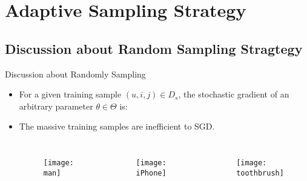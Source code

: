 \section{Adaptive Sampling Strategy}
	
\subsection*{Discussion about Random Sampling Stragtegy}
\begin{frame}{Discussion about Randomly Sampling}
	\begin{itemize}
		\setlength{\itemsep}{1.5em}
		\item For a given training sample $\left(u,i,j\right) \in D_s$, the stochastic gradient of an arbitrary parameter $\theta \in \Theta$ is:
		
		
		
		\item The massive training samples are inefficient to SGD.
		
		\begin{columns}
			\column{3cm}
			\begin{figure}
				\vspace{1em}
				\texttt{[image: man]}
			\end{figure}
			\column{4cm}
			\begin{figure}
				\vspace{1em}
				\texttt{[image: iPhone]}
			\end{figure}
			\column{4cm}
			\begin{figure}
				\vspace{1em}
				\texttt{[image: toothbrush]}
				
			\end{figure}
			
		\end{columns}
		\vspace{1em}
	
	\end{itemize}
	
\end{frame}

